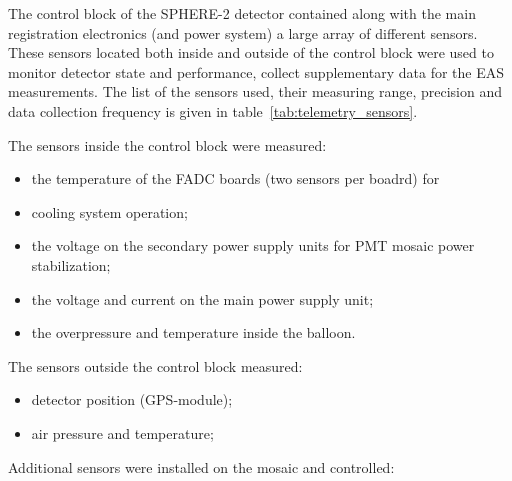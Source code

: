 \documentclass[final,5p,times,twocolumn]{elsarticle}
\begin{document}
The control block of the SPHERE-2 detector contained along with the main registration electronics (and power system) a large array of different sensors. These sensors located both inside and outside of the control block were used to monitor detector state and performance, collect supplementary data for the EAS measurements. The list of the sensors used, their measuring range, precision and data collection frequency is given in table~\ref{tab:telemetry_sensors}. 

The sensors inside the control block were measured:
\begin{itemize}
\item the temperature of the FADC boards (two sensors per boadrd) for \item cooling system operation;
\item the voltage on the secondary power supply units for PMT mosaic power stabilization;
\item the voltage and current on the main power supply unit;
\item the overpressure and temperature inside the balloon.
\end{itemize}
The sensors outside the control block measured:
\begin{itemize}
\item detector position (GPS-module);
\item air pressure and temperature;
\end{itemize}
Additional sensors were installed on the mosaic and controlled:
%
\end{document}
